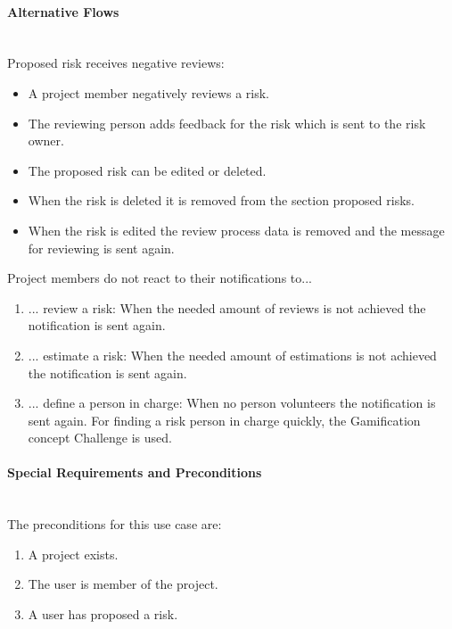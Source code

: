 \paragraph*{Alternative Flows}\mbox{}\\

\noindent
Proposed risk receives negative reviews:
\begin{itemize}
	\vspace{-3mm}
	\setlength\itemsep{-1em}
	
	\item A project member negatively reviews a risk.
	\item The reviewing person adds feedback for the risk which is sent to the risk owner.
	\item The proposed risk can be edited or deleted.
	\item When the risk is deleted it is removed from the section proposed risks.
	\item When the risk is edited the review process data is removed and the message for reviewing is sent again.
\end{itemize}

\noindent
Project members do not react to their notifications to...
\begin{enumerate}
	\vspace{-3mm}
	\setlength\itemsep{-1em}
	
	\item ... review a risk: When the needed amount of reviews is not achieved the notification is sent again.
	\item ... estimate a risk: When the needed amount of estimations is not achieved the notification is sent again.
	\item ... define a person in charge: When no person volunteers the notification is sent again. For finding a risk person in charge quickly, the Gamification concept Challenge is used.
\end{enumerate}

\paragraph*{Special Requirements and Preconditions}\mbox{}\\
The preconditions for this use case are:
\begin{enumerate}
	\vspace{-3mm}
	\setlength\itemsep{-1em}	
	\item  A project exists.
	\item The user is member of the project.
	\item A user has proposed a risk.
\end{enumerate}

